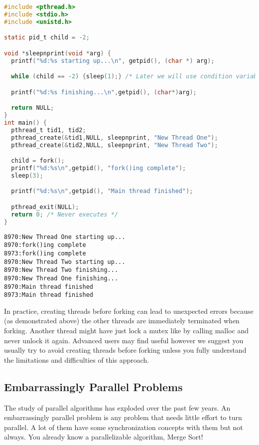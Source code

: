 \begin{lstlisting}[language=C]
#include <pthread.h>
#include <stdio.h>
#include <unistd.h>

static pid_t child = -2;

void *sleepnprint(void *arg) {
  printf("%d:%s starting up...\n", getpid(), (char *) arg);

  while (child == -2) {sleep(1);} /* Later we will use condition variables */

  printf("%d:%s finishing...\n",getpid(), (char*)arg);

  return NULL;
}
int main() {
  pthread_t tid1, tid2;
  pthread_create(&tid1,NULL, sleepnprint, "New Thread One");
  pthread_create(&tid2,NULL, sleepnprint, "New Thread Two");

  child = fork();
  printf("%d:%s\n",getpid(), "fork()ing complete");
  sleep(3);

  printf("%d:%s\n",getpid(), "Main thread finished");

  pthread_exit(NULL);
  return 0; /* Never executes */
}
\end{lstlisting}

\begin{verbatim}
8970:New Thread One starting up...
8970:fork()ing complete
8973:fork()ing complete
8970:New Thread Two starting up...
8970:New Thread Two finishing...
8970:New Thread One finishing...
8970:Main thread finished
8973:Main thread finished
\end{verbatim}

In practice, creating threads before forking can lead to unexpected errors because (as demonstrated above) the other threads are immediately terminated when forking.
Another thread might have just lock a mutex like by calling malloc and never unlock it again.
Advanced users may find  useful however we suggest you usually try to avoid creating threads before forking unless you fully understand the limitations and difficulties of this approach.

\subsection{Embarrassingly Parallel Problems}

The study of parallel algorithms has exploded over the past few years.
An embarrassingly parallel problem is any problem that needs little effort to turn parallel.
A lot of them have some synchronization concepts with them but not always.
You already know a parallelizable algorithm, Merge Sort!


